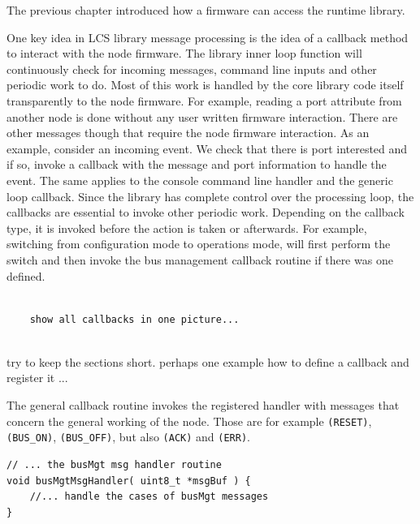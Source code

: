 
The previous chapter introduced how a firmware can access the runtime library. 

One key idea in LCS library message processing is the idea of a callback method to interact with the node firmware. The library inner loop function will continuously check for incoming messages, command line inputs and other periodic work to do. Most of this work is handled by the core library code itself transparently to the node firmware. For example, reading a port attribute from another node is done without any user written firmware interaction. There are other messages though that require the node firmware interaction. As an example, consider an incoming event. We check that there is port interested and if so, invoke a callback with the message and port information to handle the event. The same applies to the console command line handler and the generic loop callback. Since the library has complete control over the processing loop, the callbacks are essential to invoke other periodic work. Depending on the callback type, it is invoked before the action is taken or afterwards. For example, switching from configuration mode to operations mode, will first perform the switch and then invoke the bus management callback routine if there was one defined.

\lstset{language=c++, style=codesnippetstyle}
\begin{lstlisting}
   
    show all callbacks in one picture...
    
\end{lstlisting}

try to keep the sections short. perhaps one example how to define a callback and register it ...


The general callback routine invokes the registered handler with messages that concern the general working of the node. Those are for example \texttt{(RESET)}, \texttt{(BUS\_ON)}, \texttt{(BUS\_OFF)}, but also \texttt{(ACK)} and \texttt{(ERR)}.

\lstset{style=codesnippetstyle}
\begin{lstlisting}
// ... the busMgt msg handler routine
void busMgtMsgHandler( uint8_t *msgBuf ) {
	//... handle the cases of busMgt messages
}
\end{lstlisting}


